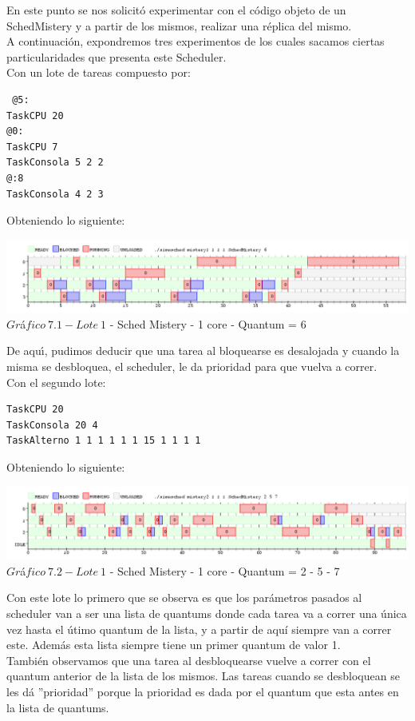 \indent En este punto se nos solicit\'{o} experimentar con el c\'{o}digo objeto de un 
SchedMistery y a partir de los mismos, realizar una r\'{e}plica del mismo.\\

A continuaci\'{o}n, expondremos tres experimentos de los cuales sacamos ciertas particularidades que presenta este Scheduler.\\

Con un lote de tareas compuesto por:\\

\begin{verbatim}
 @5:
TaskCPU 20
@0:
TaskCPU 7
TaskConsola 5 2 2
@:8
TaskConsola 4 2 3
\end{verbatim}

Obteniendo lo siguiente:
\begin{center}
    	\includegraphics[width=450pt]{./Test/ej7_1.png}
	{$Gr$\'a$fico \ 7.1 - Lote \ 1$ - Sched Mistery - 1 core - Quantum = 6}	
 \end{center}
 
De aqu\'{\i}, pudimos deducir que una tarea al bloquearse es desalojada y cuando la misma se desbloquea, el scheduler, le da 
prioridad para que vuelva a correr.\\

Con el segundo lote:\\

\begin{verbatim}
TaskCPU 20
TaskConsola 20 4
TaskAlterno 1 1 1 1 1 1 15 1 1 1 1
\end{verbatim}

Obteniendo lo siguiente:
\begin{center}
    	\includegraphics[width=450pt]{./Test/ej7_2.png}
	{$Gr$\'a$fico \ 7.2 - Lote \ 1$ - Sched Mistery - 1 core - Quantum = 2 - 5 - 7}	
 \end{center}

Con este lote lo primero que se observa es que los par\'{a}metros pasados al scheduler van a ser una lista de quantums 
donde cada tarea va a correr una \'{u}nica vez hasta el \'{u}timo quantum de la lista, y a partir de aquí siempre van a correr este. Adem\'{a}s esta lista siempre 
tiene un primer quantum de valor 1.\\
Tambi\'{e}n observamos que una tarea al desbloquearse vuelve a correr con el quantum anterior de la lista de los mismos. 
Las tareas cuando se desbloquean se les d\'{a} ''prioridad'' porque la prioridad es dada por el quantum que esta antes en 
la lista de quantums.\\

